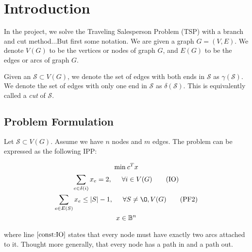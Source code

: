 \section{Introduction}
\label{sec:Introduction}

In the project, we solve the Traveling Salesperson Problem (TSP) with a branch and cut method...But first some notation. We are given a graph $G = (V,E)$. We denote $V(G)$ to be the vertices or nodes of graph $G$, and $E(G)$ to be the edges or arcs of graph $G$.

Given an $\mathcal{S} \subset V(G)$, we denote the set of edges with both ends in $\mathcal{S}$ as $\gamma(\mathcal{S})$. We denote the set of edges with only one end in $\mathcal{S}$ as $\delta(\mathcal{S})$. This is equivalently called a \textit{cut} of $\mathcal{S}$.

\subsection{Problem Formulation}
Let $\mathcal{S}\subset V(G)$. Assume we have $n$ nodes and $m$ edges. The problem can be expressed as the following IPP:


\begin{gather*}
  \textrm{min}\: c^T x \\
  \sum_{e\in\delta ({i})} x_e = 2, \hspace{5mm} \forall i \in V(G) \tag{IO}\label{cons:IO} \\
  \sum_{e\in E(S)} x_e \leq |S| -1, \hspace{5mm} \forall S \neq \O, V(G) \tag{PF2} \\
  x \in\mathbb{B}^n \label{cons:binary}
\end{gather*}


\begin{comment}
\begin{center}
  $\textrm{min}\hspace{2mm} c^T x$\\
  $x \in \mathbb{B}^n$ \\
  $\sum_{e\in\delta ({i})} x_e = 2, \hspace{5mm} \forall i \in V(G) \label{constraint:In_Out}\tag{IO}$ \\
  $\sum_{e\in E(S)} x_e \leq |S| -1, \hspace{5mm} \forall S \neq \O, V(G)$
\end{center}
\end{comment}

where line $\eqref{const:IO}$ states that every node must have exactly two arcs attached to it. Thought more generally, that every node has a path in and a path out. 
